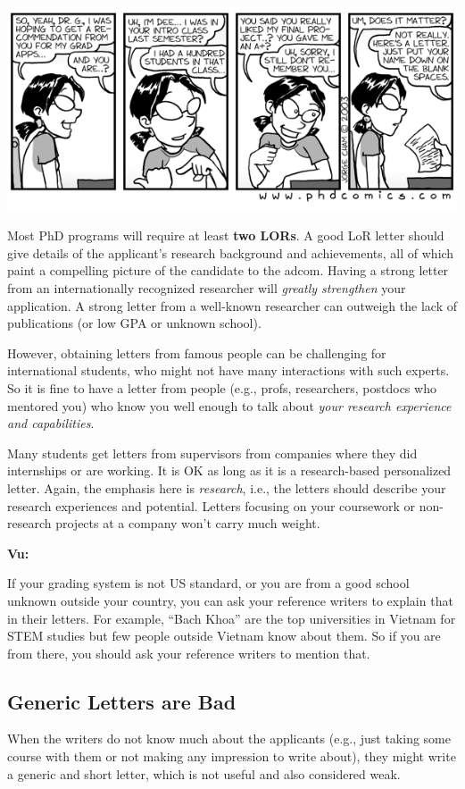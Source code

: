 \documentclass[oneside,11pt,dvipsnames]{book}
\newenvironment{commentbox}[1][]{
  \small
  \begin{mybox}
    {\small \textbf{#1}}
  }{
  \end{mybox}
}
\begin{document}
\begin{center}
  \includegraphics[width=0.6\linewidth]{files/c6.png}
\end{center}


Most PhD programs will require at least \textbf{two LORs}. A good LoR letter should give details of the applicant's research background and achievements, all of which paint a compelling picture of the candidate to the adcom.
Having a strong letter from an internationally recognized researcher will \emph{greatly strengthen} your application. A strong letter from a well-known researcher can outweigh the lack of publications (or low GPA or unknown school).


However, obtaining letters from famous people
can be challenging for international students, who might not have many interactions with such experts. So it is fine to have a letter from people (e.g., profs, researchers, postdocs who mentored you) who know you well enough to talk about \emph{your research experience and capabilities}. 

Many students get letters from supervisors from companies where they did internships or are working.  It is OK as long as it is a research-based personalized letter. Again, the emphasis here is \emph{research}, i.e., the letters should describe your research experiences and potential. Letters focusing on your coursework or non-research projects at a company won't carry much weight.

\begin{commentbox}[Vu:]
  If your grading system is not US standard, or you are from a good school unknown outside your country, you can ask your reference writers to explain that in their letters.  For example, ``Bach Khoa'' are the top universities in Vietnam for STEM studies but few people outside Vietnam know about them.  So if you are from there, you should ask your reference writers to mention that.
\end{commentbox}


\subsection{Generic Letters are Bad} When the writers do not know much about the applicants (e.g., just taking some course with them or not making any impression to write about), they might write a generic and short letter, which is not useful and also considered weak. 
\end{document}
